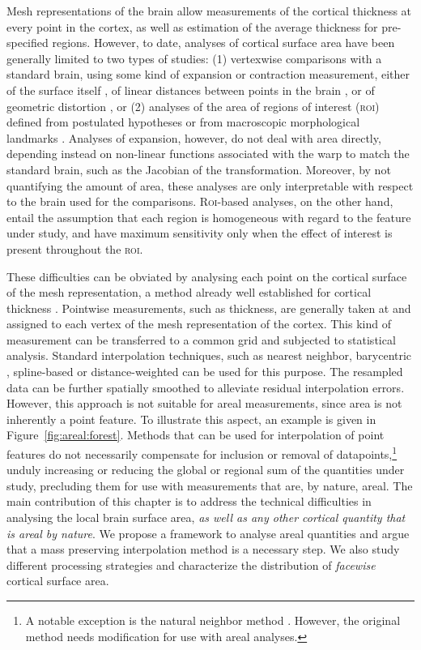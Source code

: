 Mesh representations of the brain allow measurements of the cortical thickness at every point in the cortex, as well as estimation of the average thickness for pre-specified regions. However, to date, analyses of cortical surface area have been generally limited to two types of studies: (1) vertexwise comparisons with a standard brain, using some kind of expansion or contraction measurement, either of the surface itself \citep{Joyner2009, Lyttelton2009, Hill2010, Rimol2010b, Palaniyappan2011}, of linear distances between points in the brain \citep{Sun2009a, Sun2009}, or of geometric distortion \citep{Wisco2007}, or (2) analyses of the area of regions of interest (\textsc{roi}) defined from postulated hypotheses or from macroscopic morphological landmarks \citep{Dickerson2009, Nopoulos2010, Kahler2011, Durazzo2011, Schwarzkopf2011, Eyler2011, Chen2011_neuron, Chen2012}. Analyses of expansion, however, do not deal with area directly, depending instead on non-linear functions associated with the warp to match the standard brain, such as the Jacobian of the transformation. Moreover, by not quantifying the amount of area, these analyses are only interpretable with respect to the brain used for the comparisons. R\textsc{oi}-based analyses, on the other hand, entail the assumption that each region is homogeneous with regard to the feature under study, and have maximum sensitivity only when the effect of interest is present throughout the \textsc{roi}.

These difficulties can be obviated by analysing each point on the cortical surface of the mesh representation, a method already well established for cortical thickness \citep{Fischl2000}. Pointwise measurements, such as thickness, are generally taken at and assigned to each vertex of the mesh representation of the cortex. This kind of measurement can be transferred to a common grid and subjected to statistical analysis. Standard interpolation techniques, such as nearest neighbor, barycentric \citep{Yiu2000}, spline-based \citep{DeBoor1962} or distance-weighted \citep{Shepard1968} can be used for this purpose. The resampled data can be further spatially smoothed to alleviate residual interpolation errors. However, this approach is not suitable for areal measurements, since area is not inherently a point feature. To illustrate this aspect, an example is given in Figure~\ref{fig:areal:forest}. Methods that can be used for interpolation of point features do not necessarily compensate for inclusion or removal of datapoints,\footnote{A notable exception is the natural neighbor method \citep{Sibson1981}. However, the original method needs modification for use with areal analyses.} unduly increasing or reducing the global or regional sum of the quantities under study, precluding them for use with measurements that are, by nature, areal. The main contribution of this chapter is to address the technical difficulties in analysing the local brain surface area, \emph{as well as any other cortical quantity that is areal by nature}. We propose a framework to analyse areal quantities and argue that a mass preserving interpolation method is a necessary step. We also study different processing strategies and characterize the distribution of \emph{facewise} cortical surface area.

